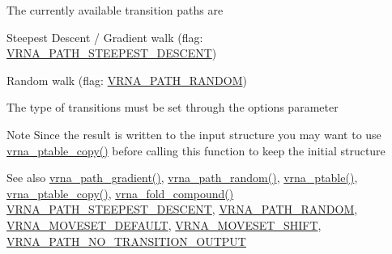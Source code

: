 The currently available transition paths are
\begin{DoxyItemize}
\item Steepest Descent / Gradient walk (flag\+: \hyperlink{group__paths_ga705cea2b3243a38a2d6e3b1e141ed061}{V\+R\+N\+A\+\_\+\+P\+A\+T\+H\+\_\+\+S\+T\+E\+E\+P\+E\+S\+T\+\_\+\+D\+E\+S\+C\+E\+NT})
\item Random walk (flag\+: \hyperlink{group__paths_ga0b84bd36bfd783130297797c51dd85ae}{V\+R\+N\+A\+\_\+\+P\+A\+T\+H\+\_\+\+R\+A\+N\+D\+OM})
\end{DoxyItemize}

The type of transitions must be set through the {\ttfamily options} parameter

\begin{DoxyNote}{Note}
Since the result is written to the input structure you may want to use \hyperlink{group__struct__utils__pair__table_ga2daefbbd6d9f8803731651882f54332d}{vrna\+\_\+ptable\+\_\+copy()} before calling this function to keep the initial structure
\end{DoxyNote}
\begin{DoxySeeAlso}{See also}
\hyperlink{group__paths_gae92cce443a8a64f7b7fb89867b7d6125}{vrna\+\_\+path\+\_\+gradient()}, \hyperlink{group__paths_ga9234756c337078fa599529d3db70d913}{vrna\+\_\+path\+\_\+random()}, \hyperlink{group__struct__utils__pair__table_gae829fb8bb7f694c12a9c0bbc34c77c60}{vrna\+\_\+ptable()}, \hyperlink{group__struct__utils__pair__table_ga2daefbbd6d9f8803731651882f54332d}{vrna\+\_\+ptable\+\_\+copy()}, \hyperlink{group__fold__compound_ga6601d994ba32b11511b36f68b08403be}{vrna\+\_\+fold\+\_\+compound()} \hyperlink{group__paths_ga705cea2b3243a38a2d6e3b1e141ed061}{V\+R\+N\+A\+\_\+\+P\+A\+T\+H\+\_\+\+S\+T\+E\+E\+P\+E\+S\+T\+\_\+\+D\+E\+S\+C\+E\+NT}, \hyperlink{group__paths_ga0b84bd36bfd783130297797c51dd85ae}{V\+R\+N\+A\+\_\+\+P\+A\+T\+H\+\_\+\+R\+A\+N\+D\+OM}, \hyperlink{group__neighbors_gaa5ffec4dd0d02df320f123e6888154d1}{V\+R\+N\+A\+\_\+\+M\+O\+V\+E\+S\+E\+T\+\_\+\+D\+E\+F\+A\+U\+LT}, \hyperlink{group__neighbors_ga68ea27c81de4b74e48b775c04052590b}{V\+R\+N\+A\+\_\+\+M\+O\+V\+E\+S\+E\+T\+\_\+\+S\+H\+I\+FT}, \hyperlink{group__paths_ga1ee63e54ecf136491e12ff03ede2622d}{V\+R\+N\+A\+\_\+\+P\+A\+T\+H\+\_\+\+N\+O\+\_\+\+T\+R\+A\+N\+S\+I\+T\+I\+O\+N\+\_\+\+O\+U\+T\+P\+UT}
\end{DoxySeeAlso}

